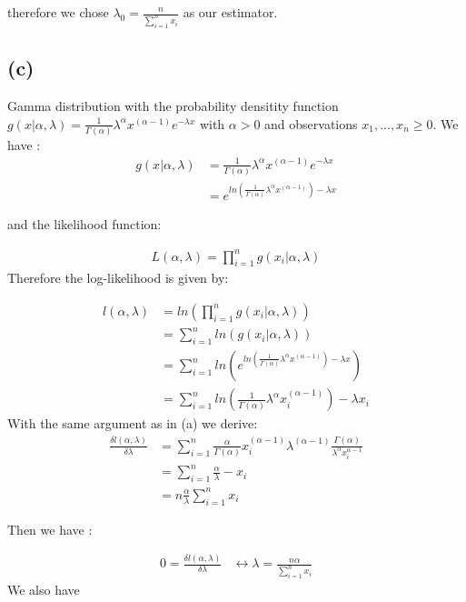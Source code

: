\documentclass{article}
\begin{document}
therefore we chose $\lambda_0 =  \frac{n}{\sum_{i=1}^n x_i}$ as our estimator.

\subsection*{(c)}

Gamma distribution with the probability densitity function $g(x|\alpha,\lambda)=\frac{1}{ \Gamma(\alpha)} \lambda^{\alpha} x^{(\alpha - 1)} e^{-\lambda x}$ with $\alpha > 0$ and observations $x_1, ..., x_n \geq 0$.
We have :
\begin{align*}
    g(x|\alpha,\lambda) &=\frac{1}{ \Gamma(\alpha)} \lambda^{\alpha} x^{(\alpha - 1)} e^{-\lambda x}\\
                &= e^{ln(\frac{1}{\Gamma(\alpha)} \lambda^{\alpha} x^{(\alpha - 1)}) -\lambda x }
\end{align*}

and the likelihood function:

\begin{align*}
    L(\alpha, \lambda)= \prod_{i=1}^n g(x_i | \alpha, \lambda)
\end{align*}
Therefore the log-likelihood is given by:

\begin{align*}
    l(\alpha, \lambda)  &= ln(\prod_{i=1}^n g(x_i | \alpha, \lambda)) \\
                &= \sum_{i=1}^n ln(g(x_i| \alpha, \lambda))\\
                &= \sum_{i=1}^n ln( e^{ln(\frac{1}{\Gamma(\alpha)} \lambda^{\alpha} x^{(\alpha - 1)}) -\lambda x })\\
                &= \sum_{i=1}^n ln(\frac{1}{\Gamma(\alpha)} \lambda^{\alpha} x_i ^{(\alpha -1)}) - \lambda x_i
\end{align*}
With the same argument as in (a) we derive:
\begin{align*}
\frac{\delta l(\alpha, \lambda)}{\delta \lambda}  &= \sum_{i=1}^n  \frac{\alpha}{\Gamma(\alpha)} x_i ^{(\alpha - 1)} \lambda ^{(\alpha - 1)} \frac{\Gamma(\alpha)}{\lambda^{\alpha} x_i ^{\alpha - 1}}\\
                                            &= \sum_{i=1}^n \frac{\alpha}{\lambda} - x_i \\
                                            &= n \frac{\alpha}{\lambda} \sum_{i=1}^n x_i
\end{align*}

Then we have :

\begin{align*}
    0  = \frac{\delta l(\alpha, \lambda)}{\delta \lambda}    & \leftrightarrow \lambda = \frac{n \alpha}{\sum_{i=1}^n x_i}
\end{align*}
We also have 
\end{document}

